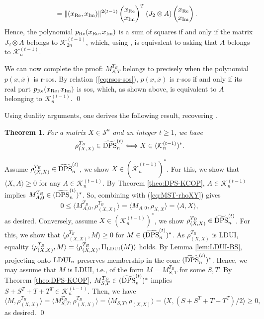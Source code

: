 \documentclass[11pt]{article}
\makeatletter
\newcommand{\MS}{{\mathcal S}}
\newcommand{\MK}{{\mathcal K}}
\newcommand{\LDUI}{\text{\rm LDUI}}
\newcommand{\DPS}{\text{\rm DPS}}
\newcommand{\tilDPSt}{\widetilde{\DPS}^{(t)}}
\newcommand{\tilMK}{\widetilde\MK}
\newcommand{\ot}{\otimes}
\newcommand{\ovx}{\overline x}
\newcommand{\Rea}{\text{\rm Re}}
\newcommand{\Ima}{\text{\rm Im}}
\theoremstyle{plain}
\newtheorem{theorem}[satz]{Theorem}
\renewenvironment{proof}[1][\proofname]{%
  \par
  \pushQED{}%
  \normalfont
  \topsep6\p@\@plus6\p@
  \trivlist
  \item[\hskip\labelsep\itshape #1\@addpunct{.}]%
}{%
  \popQED
  \endtrivlist
}
\makeatother
\begin{document}
\begin{proof}
\begin{align*}
& =  \|(x_{\Rea},x_{\Ima})\|^{2(t-1)} \begin{pmatrix} x_{\Rea}\cr x_{\Ima}\end{pmatrix}^T (J_2\ot A)  \begin{pmatrix} x_{\Rea}\cr x_{\Ima}\end{pmatrix}.
  \end{align*}
 Hence,  the  polynomial $p_\Rea(x_\Rea,x_\Ima)$ is a sum of squares  if and only if the matrix $J_2\ot A$ belongs to $\MK^{(t-1)}_{2n}$, which, 
using \cite[Lemma 15]{GL_2007}, 
is equivalent to asking that   $A$ belongs to $\MK^{(t-1)}_n$.  
  
 We can now complete the proof: $M_{S,T}^{T_B}$ belongs to \smash{$\tilDPSt_n$} precisely when the polynomial $p(x,\ovx)$ is r-sos. By relation (\ref{eq:rsos-sos}), $p(x,\ovx)$ is r-sos if and only if  its real part $p_\Rea(x_\Rea,x_\Ima)$ is sos, which, as shown above, is equivalent to $A$ belonging to $\MK^{(t-1)}_n$. %
\qed\end{proof}

Using duality arguments, one   derives the following result, %
recovering \cite[Theorem 8.16]{GNP_2025}.

\begin{theorem}\label{theo:DPS-CP}
For a matrix $X\in\MS^n$ and an integer $t\ge 1$, we have
$$  \rho_{(X,X)}^{T_B} \in \smash{\tilDPSt_n} \Longleftrightarrow    
X\in (\MK^{(t-1)}_n)^*.$$
\end{theorem}

\begin{proof}
Assume $\rho_{(X,X)}^{T_B}\in \smash{\tilDPSt_n}$, we show  
$X\in (\tilMK^{(t-1)}_n)^*$. For this,  we show that $\langle X,A\rangle \ge 0$ for any $A \in \MK^{(t-1)}_n$.
By Theorem \ref{theo:DPS-KCOP}, $A\in \MK^{(t-1)}_n$ implies  $M_{A,0}^{T_B}\in (\tilDPSt_n)^*$. So, combining with (\ref{eq:MST-rhoXY}) gives 
$$0\le \langle M_{A,0}^{T_B}, \rho_{(X,X)}^{T_B}\rangle=\langle M_{A,0}, \rho_{X,X}\rangle 
= \langle A,X\rangle,
$$
as desired. Conversely, assume $X\in (\MK^{(t-1)}_n)^*$, we show $\rho_{(X,X)}^{T_B}\in \tilDPSt_n$.
For this,
we show that $\langle \rho_{(X,X)}^{T_B},M\rangle\ge 0$ for  $M\in  (\tilDPSt_n)^*$.
As $\rho_{(X,X)}^{T_B}$ is LDUI, equality  $\langle \rho_{(X,X)}^{T_B},M\rangle =
\langle \rho_{(X,X)}^{T_B},\Pi_{\LDUI}(M)\rangle$ holds. 
By Lemma \ref{lem:LDUI-BS},   projecting onto $\LDUI_n$ preserves membership in 
the cone  {$(\tilDPSt_n)^*$}. Hence, we may assume that $M$ is LDUI, i.e.,  of the form $M=M_{S,T}^{T_B}$ for some $S,T$. By Theorem \ref{theo:DPS-KCOP},  $M_{S,T}^{T_B}\in \smash{(\tilDPSt_n)^*}$ implies 
$S+S^T+T+T^T\in \MK^{(t-1)}_n$.
Then, we have
$$\langle M, \rho_{(X,X)}^{T_B}\rangle=\langle M_{S,T}^{T_B},  \rho_{(X,X)}^{T_B}\rangle=  \langle M_{S,T}, \rho_{(X,X)}\rangle
=\langle X, (S+S^T+T+T^T)/2\rangle \ge 0,
$$
as desired.
\qed\end{proof}
\end{document}
